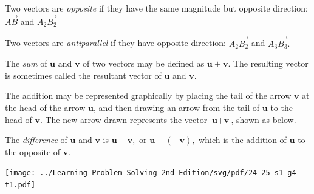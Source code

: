 \documentclass[8pt,xcolor=table,dvipsnames]{beamer}
\begin{document}
\begin{frame}[t]
\begin{overprint}
\begin{definition}
            Two vectors are \textit{opposite} if they have the same magnitude but opposite direction: $\overrightarrow{AB}$ and $\overrightarrow{A_2B_2}$
        
            Two vectors are \textit{antiparallel} if they have opposite direction: $\overrightarrow{A_2B_2}$ and $\overrightarrow{A_3B_3}.$
        \end{definition}
        
        \begin{definition}
            The \textit{sum} of $\textbf{u}$ and $\textbf{v}$ of two vectors may be defined as $\textbf{u} + \textbf{v}.$
            The resulting vector is sometimes called the resultant vector of $\textbf{u}$ and $\textbf{v}$.
            
            The addition may be represented graphically by placing the tail of the arrow $\textbf{v}$ at the head of the arrow $\textbf{u}$,
            and then drawing an arrow from the tail of $\textbf{u}$ to the head of $\textbf{v}$.
            The new arrow drawn represents the vector $\textbf{u} + \textbf{v}$, shown as below.
        
            The \textit{difference} of $\textbf{u}$ and $\textbf{v}$ is $\textbf{u} - \textbf{v},$ or $\textbf{u} + (-\textbf{v}),$ 
            which is the addition of $\textbf{u}$ to the opposite of $\textbf{v}.$
        \end{definition}
    \end{overprint}
    \begin{center}
        \texttt{[image: ../Learning-Problem-Solving-2nd-Edition/svg/pdf/24-25-s1-g4-t1.pdf]}
    \end{center}
\end{frame}
\end{document}
